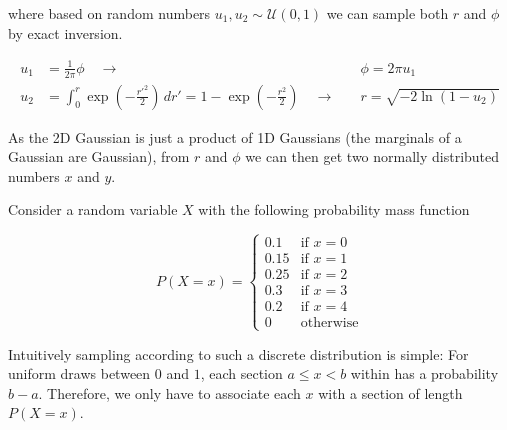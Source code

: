 where based on random numbers $u_1, u_2 \sim \mathcal{U}(0,1)$ we can sample both $r$ and $\phi$ by exact inversion.

\begin{equation}
    \begin{aligned}
        u_1 & = \frac{1}{2\pi} \phi \quad \rightarrow \quad &\phi = 2\pi u_1 \\
        u_2 & = \int_{0}^{r} \exp \left(-\frac{r'^2}{2}\right) \, dr'= 1 - \exp \left(-\frac{r^2}{2}\right) \quad \rightarrow \quad & r = \sqrt{-2 \ln(1 - u_2)}
    \end{aligned}
\end{equation}

As the 2D Gaussian is just a product of 1D Gaussians (the marginals of a Gaussian are Gaussian), from $r$ and $\phi$ we can then get two normally distributed numbers $x$ and $y$.



Consider a random variable $X$ with the following probability mass function

\begin{equation}
    P(X = x) = \begin{cases}
        0.1 & \text{if } x = 0 \\
        0.15 & \text{if } x = 1 \\
        0.25 & \text{if } x = 2 \\
        0.3 & \text{if } x = 3 \\
        0.2 & \text{if } x = 4 \\
        0 & \text{otherwise}
    \end{cases}
    \label{eq:discrete}
\end{equation}

Intuitively sampling according to such a discrete distribution is simple: 
For uniform draws between $0$ and $1$, each section $a \le x < b$ within has a probability $b - a$.
Therefore, we only have to associate each $x$ with a section of length $P(X = x)$.

